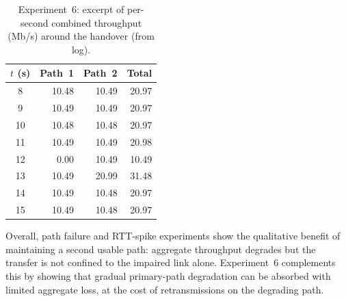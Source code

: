 \begin{table}[htbp]
  \centering
  \caption{Experiment~6: excerpt of per-second combined throughput (Mb/s) around the handover (from log).}
  \label{tab:exp6timeseries}
  \begin{tabular}{crrr}
    \toprule
    $t$ (s) & Path~1 & Path~2 & Total \\
    \midrule
    8 & 10.48 & 10.49 & 20.97 \\
    9 & 10.49 & 10.49 & 20.97 \\
    10 & 10.48 & 10.48 & 20.97 \\
    11 & 10.49 & 10.49 & 20.98 \\
    12 & 0.00 & 10.49 & 10.49 \\
    13 & 10.49 & 20.99 & 31.48 \\
    14 & 10.49 & 10.48 & 20.97 \\
    15 & 10.49 & 10.48 & 20.97 \\
    \bottomrule
  \end{tabular}
\end{table}

Overall, path failure and RTT-spike experiments show the qualitative benefit of maintaining a second usable path: aggregate throughput degrades but the transfer is not confined to the impaired link alone. Experiment~6 complements this by showing that gradual primary-path degradation can be absorbed with limited aggregate loss, at the cost of retransmissions on the degrading path.
